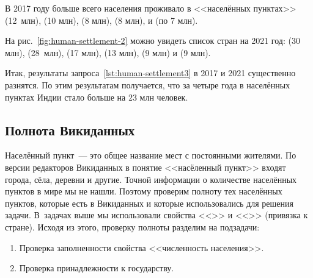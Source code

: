 
В 2017 году больше всего населения проживало в <<населённых пунктах>> 
 (12~млн), 
 (\num{10} млн), 
 (\num{8} млн), 
 (\num{8} млн), 
 и 
 (по \num{7} млн). 

На рис.~\ref{fig:human-settlement-2} можно увидеть список стран на 2021 год: 
 (\num{30} млн), 
 (28~млн), 
 (\num{17} млн), 
 (\num{13} млн), 
 (\num{9} млн) и 
 (\num{9} млн). 

Итак, результаты запроса~\ref{lst:human-settlement3} в 2017 и 2021 существенно разнятся. 
По этим результатам получается, что за четыре года 
в населённых пунктах Индии стало больше на 23 млн человек. 


\subsection{Полнота Викиданных}

Населённый пункт~--- это общее название мест с постоянными жителями\autocite{Humansettlements_Dictionary}. 
По версии редакторов Викиданных в понятие <<насёленный пункт>> входят города, сёла, деревни 
и другие.
Точной информации о количестве населённых пунктов в мире мы не нашли. 
Поэтому проверим полноту тех населённых пунктов, которые есть в Викиданных 
и которые использовались для решения задачи. 
В~задачах выше мы использовали свойства <<>> и 
<<>> (привязка к стране). 
Исходя из этого, проверку полноты разделим на подзадачи: 
\begin{enumerate} 
  \item Проверка заполненности свойства <<численность населения>>.
  \item Проверка принадлежности к государству.
\end{enumerate}


